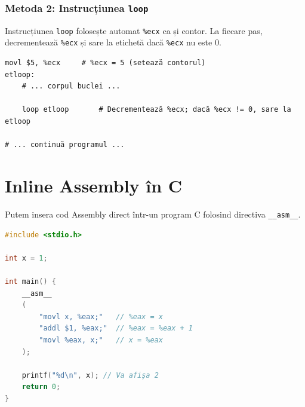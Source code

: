 \documentclass[12pt]{article}
\begin{document}
\subsubsection{Metoda 2: Instrucțiunea \texttt{loop}}
Instrucțiunea \texttt{loop} folosește automat \texttt{\%ecx} ca și contor. La fiecare pas, decrementează \texttt{\%ecx} și sare la etichetă dacă \texttt{\%ecx} nu este 0.

\begin{lstlisting}[language=x86asm]
    movl $5, %ecx     # %ecx = 5 (setează contorul)
etloop:
    # ... corpul buclei ...
    
    loop etloop       # Decrementează %ecx; dacă %ecx != 0, sare la etloop
    
# ... continuă programul ...
\end{lstlisting}

\section{Inline Assembly în C}
Putem insera cod Assembly direct într-un program C folosind directiva \texttt{\_\_asm\_\_}.

\begin{lstlisting}[language=c, caption={Exemplu de inline assembly în C}]
#include <stdio.h>

int x = 1;

int main() {
    __asm__
    (
        "movl x, %eax;"   // %eax = x
        "addl $1, %eax;"  // %eax = %eax + 1
        "movl %eax, x;"   // x = %eax
    );
    
    printf("%d\n", x); // Va afișa 2
    return 0;
}
\end{lstlisting}
\end{document}
